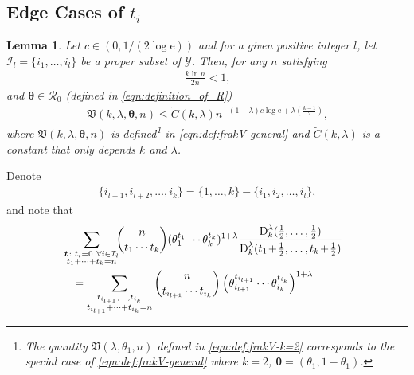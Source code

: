 \documentclass[journal, 10pt]{IEEEtran}
\newcommand{\rme}{\mathrm{e}}
\newcommand{\cI}{\mathcal{I}}
\newcommand{\cR}{\mathcal{R}}
\newcommand{\cY}{\mathcal{Y}}
\newcommand{\mfrakV}{\mathfrak{V}}
\theoremstyle{plain}
\theoremstyle{plain}
\newtheorem{lem}{Lemma}%
\theoremstyle{plain}
\theoremstyle{plain}
\newcommand{\boldtheta}{\mathbold{\theta}}
\newcommand{\boldt}{\mathbold{t}}
\newcommand{\opD}{\operatorname{D}}
\begin{document}
\begin{appendices}
\section{Edge Cases of $t_i$}\label{appdx:edge cases of t_i}
\begin{lem}\label{lem:edge cases of ti}
Let $c\in (0, 1/(2\log \rme))$ and for a given positive integer $l$, let $\cI_l=\{i_1, \hdots, i_l\}$ be a proper subset of $\cY$. Then, for any $n$ satisfying
\begin{align}
\frac{k\ln n}{2n} < 1\text{,}
\end{align}
and $\boldtheta \in \cR_0$ (defined in \eqref{eqn:definition_of_R})
\begin{align}
\mfrakV(k, \lambda, \boldtheta, n) \le 
\widetilde{C}(k,\lambda) n^{-(1+\lambda)c\log \rme + \lambda \left(\frac{k-1}{2} 
\right)} \text{,} \label{eqn:edge cases of t_i bound}
\end{align} 
where $\mfrakV(k, \lambda, \boldtheta, n)$ is defined\footnote{The quantity $\mfrakV( \lambda, \theta_1, n) $ defined in \eqref{eqn:def:frakV-k=2} corresponds to the special case of \eqref{eqn:def:frakV-general} where $k=2 $, $\boldtheta=(\theta_1, 1-\theta_1 ) $.} in \eqref{eqn:def:frakV-general} and $\widetilde{C}(k,\lambda)$ is a constant that only depends $k$ and $\lambda$.
\end{lem}
\begin{IEEEproof}
Denote 
\begin{align}
\{i_{l+1}, i_{l+2}, \hdots, i_k\} = \{1, \hdots, k\} -\{i_1, i_2, \hdots, i_l\}\text{,}
\end{align}
and note that
\begin{align}
&\hspace{-3mm} \sum_{\substack{\boldt \colon t_i=0\ \forall i \in \cI_l \\ t_1+\cdots+t_k=n }} \hspace{-1.5mm}  \binom{n}{t_1 \cdots t_k} \hspace{-0.1mm} (\theta_1^{t_1} \cdots \theta_k^{t_k})^{1+\lambda} \frac{\opD^{\lambda}_k( \frac12, \ldots, \frac12)}{{\opD^{\lambda}_k(t_1 \hspace{-0.5mm} +\hspace{-0.5mm}\frac12, \ldots ,t_k\hspace{-0.5mm}+\hspace{-0.5mm}\frac12)}} \nonumber \\
&=
\sum_{\substack{t_{i_{l+1}},\hdots, t_{i_k} \\ t_{i_{l+1}}+\cdots+t_{i_k}=n }}  \binom{n}{t_{i_{l+1}}\cdots t_{i_k}}\left( \theta_{i_{l+1}}^{t_{i_{l+1}}} \cdots \theta_{i_k}^{t_{i_k}} \right)^{1+\lambda} \label{cczz:summation} \\

\end{align}
\end{IEEEproof}
\end{appendices}
\end{document}
